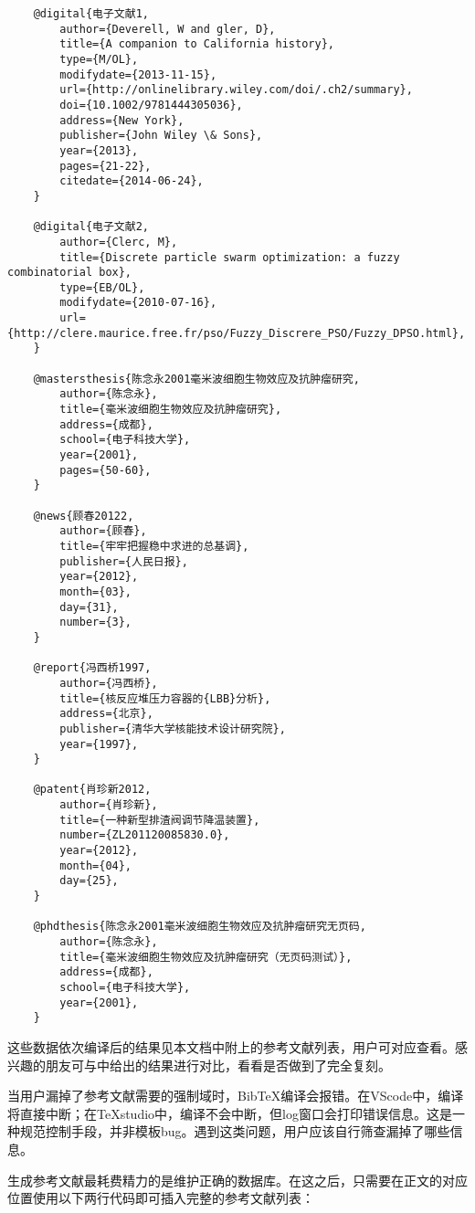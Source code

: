 \documentclass[print, doctor, vlined]{DissertUESTC}
\begin{document}
\begin{verbatim}
	@digital{电子文献1,
	    author={Deverell, W and gler, D},
	    title={A companion to California history},
	    type={M/OL},
	    modifydate={2013-11-15},
	    url={http://onlinelibrary.wiley.com/doi/.ch2/summary},
	    doi={10.1002/9781444305036},
	    address={New York},
	    publisher={John Wiley \& Sons},
	    year={2013},
	    pages={21-22},
	    citedate={2014-06-24},
	}
	
	@digital{电子文献2,
	    author={Clerc, M},
	    title={Discrete particle swarm optimization: a fuzzy combinatorial box},
	    type={EB/OL},
	    modifydate={2010-07-16},
	    url={http://clere.maurice.free.fr/pso/Fuzzy_Discrere_PSO/Fuzzy_DPSO.html},
	}
	
	@mastersthesis{陈念永2001毫米波细胞生物效应及抗肿瘤研究,
	    author={陈念永},
	    title={毫米波细胞生物效应及抗肿瘤研究},
	    address={成都},
	    school={电子科技大学},
	    year={2001},
	    pages={50-60},
	}
	
	@news{顾春20122,
	    author={顾春},
	    title={牢牢把握稳中求进的总基调},
	    publisher={人民日报},
	    year={2012},
	    month={03},
	    day={31},
	    number={3},
	}
	
	@report{冯西桥1997,
	    author={冯西桥},
	    title={核反应堆压力容器的{LBB}分析},
	    address={北京},
	    publisher={清华大学核能技术设计研究院},
	    year={1997},
	}
	
	@patent{肖珍新2012,
	    author={肖珍新},
	    title={一种新型排渣阀调节降温装置},
	    number={ZL201120085830.0},
	    year={2012},
	    month={04},
	    day={25},
	}

	@phdthesis{陈念永2001毫米波细胞生物效应及抗肿瘤研究无页码,
	    author={陈念永},
	    title={毫米波细胞生物效应及抗肿瘤研究（无页码测试）},
	    address={成都},
	    school={电子科技大学},
	    year={2001},
	}
	\end{verbatim}
	
	这些数据依次编译后的结果见本文档中附上的参考文献列表，用户可对应查看。感兴趣的朋友可与\href{https://gr.uestc.edu.cn/xiazai/114/3917}{}中给出的结果进行对比，看看是否做到了完全复刻。

	当用户漏掉了参考文献需要的强制域时，BibTeX编译会报错。在VScode中，编译将直接中断；在TeXstudio中，编译不会中断，但log窗口会打印错误信息。这是一种规范控制手段，并非模板bug。遇到这类问题，用户应该自行筛查漏掉了哪些信息。
	
	生成参考文献最耗费精力的是维护正确的数据库。在这之后，只需要在正文的对应位置使用以下两行代码即可插入完整的参考文献列表：
	\begin{verbatim}
		
		
	\end{verbatim}
	
\end{document}
